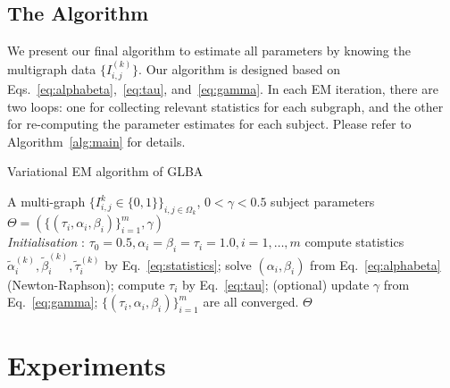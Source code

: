 \documentclass[10pt,journal,letterpaper,compsoc,twoside]{IEEEtran}
\begin{document}
\subsection{The Algorithm}

We present our final algorithm to estimate all parameters by
knowing the multigraph data $\{ I_{i,j}^{( k )} \}$. Our algorithm is designed based
on Eqs.~\eqref{eq:alphabeta},~\eqref{eq:tau}, and~\eqref{eq:gamma}.
In each EM iteration, there are two loops: one for collecting
relevant statistics for each subgraph, and the other for re-computing
the parameter estimates for each subject. 
Please refer to Algorithm~\ref{alg:main} for details.

\begin{algorithm}[H]
 \caption{Variational EM algorithm of GLBA}\label{alg:main}
\begin{algorithmic}[1]
 \renewcommand{\algorithmicrequire}{\textbf{Input:}}
 \renewcommand{\algorithmicensure}{\textbf{Output:}}
 \REQUIRE A multi-graph $\{I_{i,j}^{k}\in \{0,1\} \}_{i,j\in \Omega_k}$, $0<\gamma<0.5$
 \ENSURE subject parameters $\Theta=(\{(\tau_i, \alpha_i, \beta_i)\}_{i=1}^m,\gamma)$
 \\ \textit{Initialisation} : $\tau_0=0.5, \alpha_i=\beta_i=\tau_i=1.0,i=1,\ldots,m$
 \REPEAT
  \STATE compute statistics $\tilde{\alpha}_i^{(k)}, \tilde{\beta}_i^{(k)}, \tilde{\tau}_i^{(k)}$ by Eq.~\eqref{eq:statistics};
  \ENDFOR
  \STATE solve $(\alpha_i,\beta_i)$ from Eq.~\eqref{eq:alphabeta} (Newton-Raphson);
  \STATE compute $\tau_i$ by Eq.~\eqref{eq:tau};
  \ENDFOR
  \STATE (optional) update $\gamma$ from Eq.~\eqref{eq:gamma};
 \UNTIL $\{(\tau_i, \alpha_i, \beta_i)\}_{i=1}^m$ are all converged. 
 \RETURN $\Theta$ 
\end{algorithmic} 
\end{algorithm}
 
\section{Experiments}\label{sec:exp}
\end{document}
